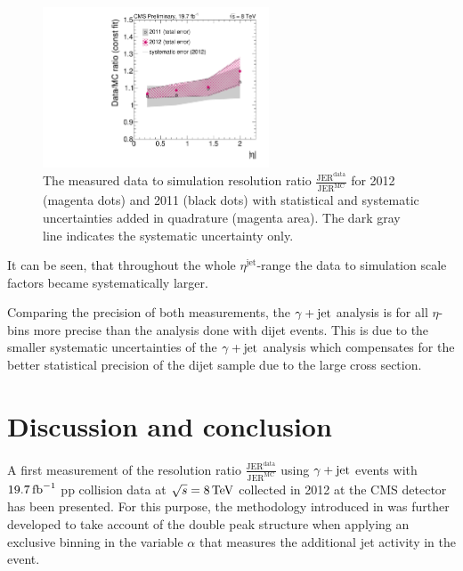 \begin{figure}[b]
 \centering
    \includegraphics[width=0.6\textwidth]{figures/resolution/results/resultsComparisonFINAL.pdf}
  \caption{The measured data to simulation resolution ratio $\frac{\text{JER}^{\text{data}}}{\text{JER}^{\text{MC}}}$ for 2012 (magenta dots) and 2011 (black dots)
           with statistical and systematic uncertainties added in quadrature (magenta area). The dark gray line indicates the systematic uncertainty only.}
  \label{fig:RatioFinal}
\end{figure}

It can be seen, that throughout the whole $\eta^{\text{jet}}$-range the data to simulation scale factors became systematically larger. 


Comparing the precision of both measurements, the $\gamma + \text{jet}$ analysis is for all $\eta$-bins more precise than the analysis done with dijet events.
This is due to the smaller systematic uncertainties of the $\gamma + \text{jet}$ analysis which compensates for the better statistical precision of the dijet sample due to the large 
cross section.




\FloatBarrier
\chapter{Discussion and conclusion}
A first measurement of the resolution ratio $\frac{\text{JER}^{\text{data}}}{\text{JER}^{\text{MC}}}$ 
using $\gamma + \text{jet}$ events with $19.7\,\text{fb}^{-1}$ pp collision data at $\sqrt{s}=8 \,\text{Te}\kern-0.06667em\text{V}$ collected in 2012 at the CMS detector has been presented. 
For this purpose, the methodology introduced in \cite{CMS-AN-2010-076}
was further developed to take account of the double peak structure when applying an exclusive binning in the variable $\alpha$ 
that measures the additional jet activity in the event.

